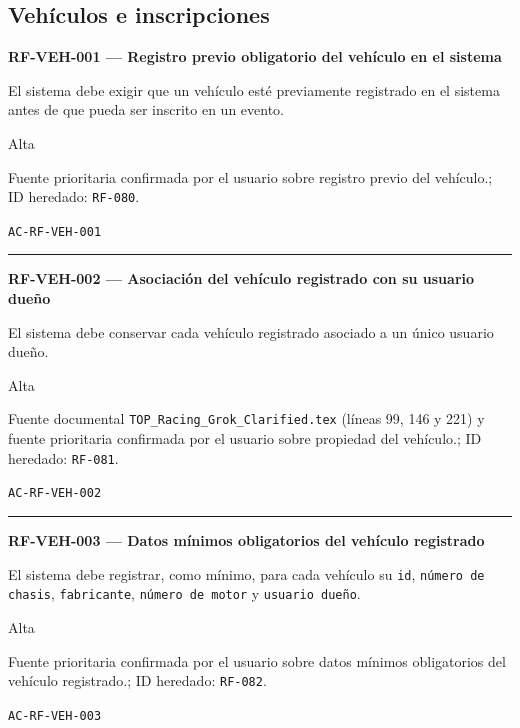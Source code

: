 \documentclass[10pt,letterpaper]{article}
\begin{document}
\subsection{Vehículos e inscripciones}
\noindent\textbf{RF-VEH-001 --- Registro previo obligatorio del vehículo en el sistema}\par
\begin{description}[style=nextline,leftmargin=3.15cm,labelwidth=2.8cm,font=\normalfont\bfseries]
\item[Obligación] El sistema debe exigir que un vehículo esté previamente registrado en el sistema antes de que pueda ser inscrito en un evento.
\item[Prioridad] Alta
\item[Procedencia] Fuente prioritaria confirmada por el usuario sobre registro previo del vehículo.; ID heredado: \texttt{RF-080}.
\item[Verificación] \texttt{AC-RF-VEH-001}
\end{description}
\vspace{0.25em}\hrule\vspace{0.65em}
\noindent\textbf{RF-VEH-002 --- Asociación del vehículo registrado con su usuario dueño}\par
\begin{description}[style=nextline,leftmargin=3.15cm,labelwidth=2.8cm,font=\normalfont\bfseries]
\item[Obligación] El sistema debe conservar cada vehículo registrado asociado a un único usuario dueño.
\item[Prioridad] Alta
\item[Procedencia] Fuente documental \texttt{TOP\_Racing\_Grok\_Clarified.tex} (líneas 99, 146 y 221) y fuente prioritaria confirmada por el usuario sobre propiedad del vehículo.; ID heredado: \texttt{RF-081}.
\item[Verificación] \texttt{AC-RF-VEH-002}
\end{description}
\vspace{0.25em}\hrule\vspace{0.65em}
\noindent\textbf{RF-VEH-003 --- Datos mínimos obligatorios del vehículo registrado}\par
\begin{description}[style=nextline,leftmargin=3.15cm,labelwidth=2.8cm,font=\normalfont\bfseries]
\item[Obligación] El sistema debe registrar, como mínimo, para cada vehículo su \texttt{id}, \texttt{número de chasis}, \texttt{fabricante}, \texttt{número de motor} y \texttt{usuario dueño}.
\item[Prioridad] Alta
\item[Procedencia] Fuente prioritaria confirmada por el usuario sobre datos mínimos obligatorios del vehículo registrado.; ID heredado: \texttt{RF-082}.
\item[Verificación] \texttt{AC-RF-VEH-003}
\end{description}
\end{document}
